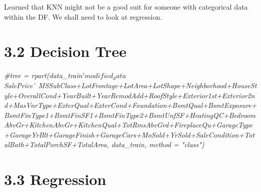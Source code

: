 \documentclass[]{article}
\newenvironment{Shaded}{\begin{snugshade}}{\end{snugshade}}
\newcommand{\CommentTok}[1]{\textcolor[rgb]{0.56,0.35,0.01}{\textit{#1}}}
\begin{document}
Learned that KNN might not be a good suit for someone with categorical
data within the DF. We shall need to look at regression.

\section{3.2 Decision Tree}\label{decision-tree}

\begin{Shaded}
\begin{Highlighting}[]
\CommentTok{#tree = rpart(data_train$'modified_data$SalePrice'~MSSubClass+LotFrontage+LotArea+LotShape+Neighborhood+HouseStyle+OverallCond+YearBuilt+YearRemodAdd+RoofStyle+Exterior1st+Exterior2nd+MasVnrType+ExterQual+ExterCond+Foundation+BsmtQual+BsmtExposure+BsmtFinType1+BsmtFinSF1+BsmtFinType2+BsmtUnfSF+HeatingQC+BedroomAbvGr+KitchenAbvGr+KitchenQual+TotRmsAbvGrd+FireplaceQu+GarageType+GarageYrBlt+GarageFinish+GarageCars+MoSold+YrSold+SaleCondition+TotalBath+TotalPorchSF+TotalArea, data_train, method = "class")}
\end{Highlighting}
\end{Shaded}

\section{3.3 Regression}\label{regression}
\end{document}
